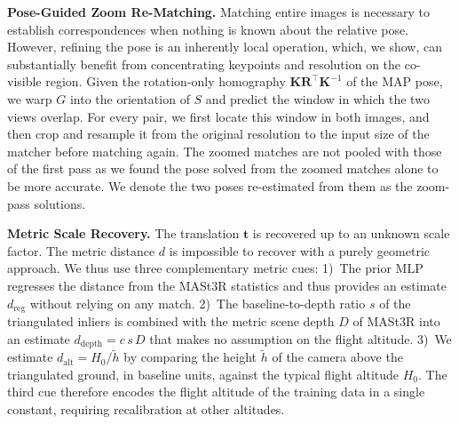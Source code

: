 \noindent\textbf{Pose-Guided Zoom Re-Matching.}
Matching entire images is necessary to establish correspondences when nothing is known about the relative pose. However, refining the pose is an inherently local operation, which, we show, can substantially benefit from concentrating keypoints and resolution on the co-visible region. Given the rotation-only homography $\mathbf{K}\mathbf{R}^\top\mathbf{K}^{-1}$ of the MAP pose, we warp $G$ into the orientation of $S$ and predict the window in which the two views overlap. For every pair, we first locate this window in both images, and then crop and resample it from the original resolution to the input size of the matcher before matching again. The zoomed matches are not pooled with those of the first pass as we found the pose solved from the zoomed matches alone to be more accurate. We denote the two poses re-estimated from them as the zoom-pass solutions.

\noindent\textbf{Metric Scale Recovery.}
The translation $\mathbf{t}$ is recovered up to an unknown scale factor. The metric distance $d$ is impossible to recover with a purely geometric approach. We thus use three complementary metric cues: 1)~The prior MLP regresses the distance from the MASt3R statistics and thus provides an estimate $d_{\text{reg}}$ without relying on any match. 2)~The baseline-to-depth ratio $s$ of the triangulated inliers is combined with the metric scene depth $D$ of MASt3R into an estimate $d_{\text{depth}}=c\,s\,D$ that makes no assumption on the flight altitude. 3)~We estimate $d_{\text{alt}}=H_0/\tilde h$ by comparing the height $\tilde h$ of the camera above the triangulated ground, in baseline units, against the typical flight altitude $H_0$. The third cue therefore encodes the flight altitude of the training data in a single constant, requiring recalibration at other altitudes.

